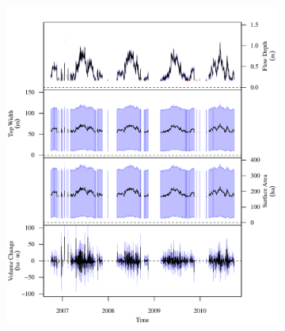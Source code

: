 \begin{linenumbers}
\subfiguremid
\begin{landscape}
	\begin{figure}
		\begin{subfigure}{0.7\textwidth}
			\centering
			\includegraphics[width=\tableCustomSize]{"Figures/Results_USR/Stochastic/G TS C"}
			\label{sub:GeoTS_C}	
		\end{subfigure}%
		\begin{subfigure}{0.7\textwidth}
			\centering			

\end{subfigure}
\end{figure}
\end{landscape}
\end{linenumbers}
